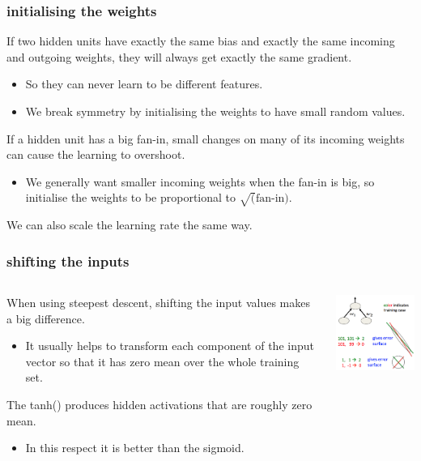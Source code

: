 \documentclass[USenglish,pdftex,compress,10pt,svgnamesi,handout]{beamer}
\begin{document}
\begin{frame}
\frametitle{initialising the weights}
If two hidden units have exactly the same bias and exactly the same incoming and outgoing weights, they will always get exactly the same gradient.
\begin{itemize}
\item  So they can never learn to be different features.
\item  We break symmetry by initialising the weights to have small random values.
\end{itemize}
If a hidden unit has a big fan-in, small changes on many of its incoming weights can cause the learning to overshoot.
\begin{itemize}
\item  We generally want smaller incoming weights when the fan-in is big, so initialise the weights to be proportional to $\sqrt(\textrm{fan-in})$.
\end{itemize}
We can also scale the learning rate the same way.
\end{frame}




\begin{frame}
\frametitle{shifting the inputs}
\begin{columns}
\begin{column}{6cm}
When using steepest descent, shifting the input values makes a big difference.
\begin{itemize}
\item It usually helps to transform each component of the input vector so that it has zero mean over the whole training set.
\end{itemize}

The tanh() produces hidden activations that are roughly zero mean.
\begin{itemize}
\item In this respect it is better than the sigmoid.
\end{itemize}
\end{column}
\begin{column}{5cm}
\includegraphics[width=5cm]{pics/2-inputshift.png}
\end{column}
\end{columns}
\end{frame}
\end{document}
